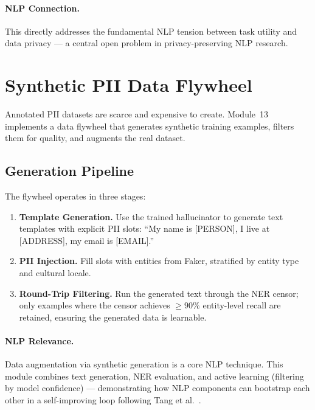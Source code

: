 \documentclass[11pt, a4paper]{article}
\begin{document}
\paragraph{NLP Connection.}
This directly addresses the fundamental NLP tension between task utility and data privacy --- a central open problem in privacy-preserving NLP research.


\section{Synthetic PII Data Flywheel}
\label{sec:synthetic}

Annotated PII datasets are scarce and expensive to create.  Module~13 implements a data flywheel that generates synthetic training examples, filters them for quality, and augments the real dataset.

\subsection{Generation Pipeline}

The flywheel operates in three stages:
\begin{enumerate}
  \item \textbf{Template Generation.}  Use the trained hallucinator to generate text templates with explicit PII slots: ``My name is [PERSON], I live at [ADDRESS], my email is [EMAIL].''
  \item \textbf{PII Injection.}  Fill slots with entities from Faker, stratified by entity type and cultural locale.
  \item \textbf{Round-Trip Filtering.}  Run the generated text through the NER censor; only examples where the censor achieves $\geq 90\%$ entity-level recall are retained, ensuring the generated data is learnable.
\end{enumerate}

\paragraph{NLP Relevance.}
Data augmentation via synthetic generation is a core NLP technique.  This module combines text generation, NER evaluation, and active learning (filtering by model confidence) --- demonstrating how NLP components can bootstrap each other in a self-improving loop following Tang et al.~\cite{tang2024synthetic}.


\end{document}

